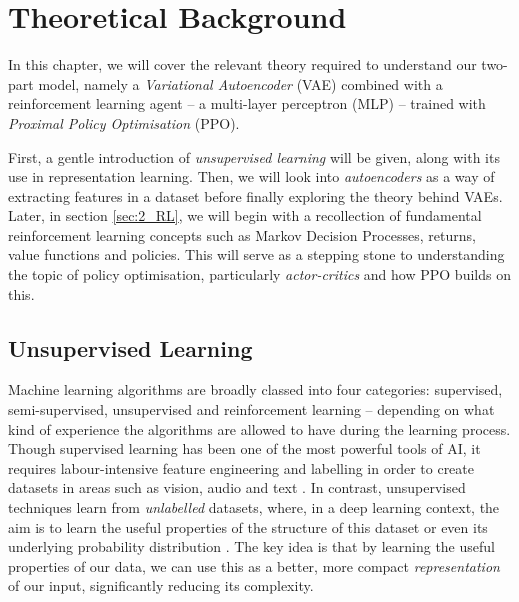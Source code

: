 \chapter{Theoretical Background}
\label{chap:2_background}


In this chapter, we will cover the relevant theory required to understand our two-part model, namely a \textit{Variational Autoencoder} (VAE) combined with a reinforcement learning agent -- a multi-layer perceptron (MLP) -- trained with \textit{Proximal Policy Optimisation} (PPO). 

First, a gentle introduction of \textit{unsupervised learning} will be given, along with its use in representation learning. Then, we will look into \textit{autoencoders} as a way of extracting features in a dataset before finally exploring the theory behind VAEs.
Later, in section \ref{sec:2_RL}, we will begin with a recollection of fundamental reinforcement learning concepts such as Markov Decision Processes, returns, value functions and policies. This will serve as a stepping stone to understanding the topic of policy optimisation, particularly \textit{actor-critics} and how PPO builds on this.


\section{Unsupervised Learning}
\label{sec:2_unsupervised_learning}
Machine learning algorithms are broadly classed into four categories: supervised, semi-supervised, unsupervised and reinforcement learning -- depending on what kind of experience the algorithms are allowed to have during the learning process. 
Though supervised learning has been one of the most powerful tools of AI, it requires labour-intensive feature engineering and labelling in order to create datasets in areas such as vision, audio and text \cite{LectureNotesSparseAutoencoder}. In contrast, unsupervised techniques learn from \textit{unlabelled} datasets, where, in a deep learning context, the aim is to learn the useful properties of the structure of this dataset or even its underlying probability distribution \cite{DeepLearningBook}.
The key idea is that by learning the useful properties of our data, we can use this as a better, more compact \textit{representation} of our input, significantly reducing its complexity.


